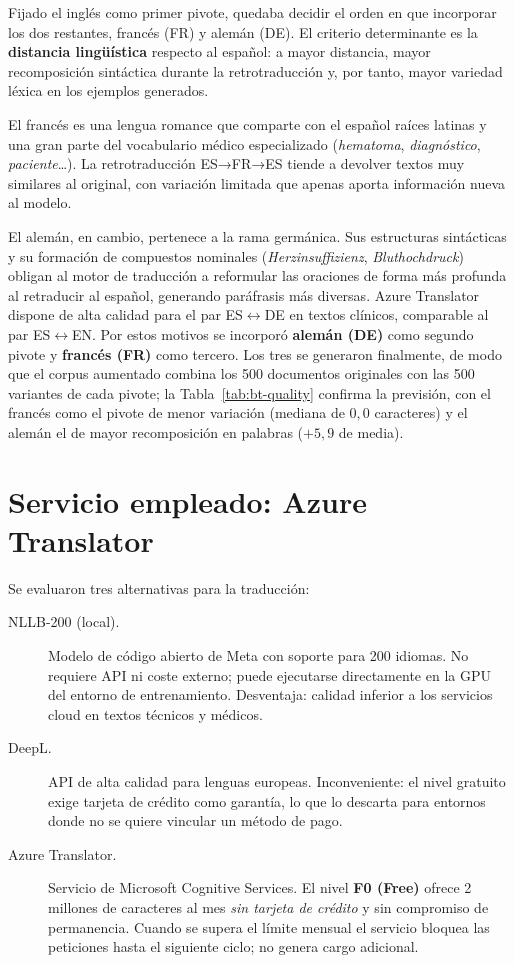 Fijado el inglés como primer pivote, quedaba decidir el orden en que incorporar los dos restantes, francés (FR) y alemán (DE). El criterio determinante es la \textbf{distancia lingüística} respecto al español: a mayor distancia, mayor recomposición sintáctica durante la retrotraducción y, por tanto, mayor variedad léxica en los ejemplos generados.

El francés es una lengua romance que comparte con el español raíces latinas y una gran parte del vocabulario médico especializado (\emph{hematoma}, \emph{diagnóstico}, \emph{paciente}…). La retrotraducción ES→FR→ES tiende a devolver textos muy similares al original, con variación limitada que apenas aporta información nueva al modelo.

El alemán, en cambio, pertenece a la rama germánica. Sus estructuras sintácticas y su formación de compuestos nominales (\emph{Herzinsuffizienz}, \emph{Bluthochdruck}) obligan al motor de traducción a reformular las oraciones de forma más profunda al retraducir al español, generando paráfrasis más diversas. Azure Translator dispone de alta calidad para el par ES$\leftrightarrow$DE en textos clínicos, comparable al par ES$\leftrightarrow$EN. Por estos motivos se incorporó \textbf{alemán (DE)} como segundo pivote y \textbf{francés (FR)} como tercero. Los tres se generaron finalmente, de modo que el corpus aumentado combina los 500 documentos originales con las 500 variantes de cada pivote; la Tabla~\ref{tab:bt-quality} confirma la previsión, con el francés como el pivote de menor variación (mediana de $0{,}0$ caracteres) y el alemán el de mayor recomposición en palabras ($+5{,}9$ de media).

\section{Servicio empleado: Azure Translator}

Se evaluaron tres alternativas para la traducción:

\begin{description}
  \item[NLLB-200 (local).] Modelo de código abierto de Meta con soporte para 200 idiomas. No requiere API ni coste externo; puede ejecutarse directamente en la GPU del entorno de entrenamiento. Desventaja: calidad inferior a los servicios cloud en textos técnicos y médicos.
  \item[DeepL.] API de alta calidad para lenguas europeas. Inconveniente: el nivel gratuito exige tarjeta de crédito como garantía, lo que lo descarta para entornos donde no se quiere vincular un método de pago.
  \item[Azure Translator.] Servicio de Microsoft Cognitive Services. El nivel \textbf{F0 (Free)} ofrece 2 millones de caracteres al mes \emph{sin tarjeta de crédito} y sin compromiso de permanencia. Cuando se supera el límite mensual el servicio bloquea las peticiones hasta el siguiente ciclo; no genera cargo adicional.
\end{description}

